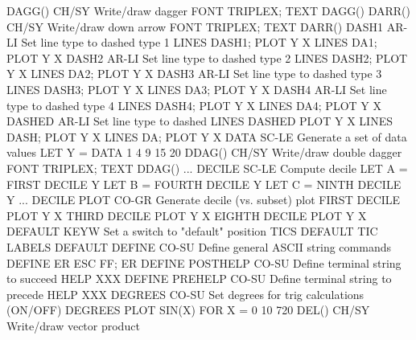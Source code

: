 DAGG()                      CH/SY Write/draw dagger
                                  FONT TRIPLEX; TEXT DAGG()
DARR()                      CH/SY Write/draw down arrow
                                  FONT TRIPLEX; TEXT DARR()
DASH1                       AR-LI Set line type to dashed type 1
                                  LINES DASH1; PLOT Y X
                                  LINES DA1; PLOT Y X
DASH2                       AR-LI Set line type to dashed type 2
                                  LINES DASH2; PLOT Y X
                                  LINES DA2; PLOT Y X
DASH3                       AR-LI Set line type to dashed type 3
                                  LINES DASH3; PLOT Y X
                                  LINES DA3; PLOT Y X
DASH4                       AR-LI Set line type to dashed type 4
                                  LINES DASH4; PLOT Y X
                                  LINES DA4; PLOT Y X
DASHED                      AR-LI Set line type to dashed
                                  LINES DASHED PLOT Y X
                                  LINES DASH; PLOT Y X
                                  LINES DA; PLOT Y X
DATA                        SC-LE Generate a set of data values
                                  LET Y = DATA 1 4 9 15 20
DDAG()                      CH/SY Write/draw double dagger
                                  FONT TRIPLEX; TEXT DDAG()
... DECILE                  SC-LE Compute decile
                                  LET A = FIRST DECILE Y
                                  LET B = FOURTH DECILE Y
                                  LET C = NINTH DECILE Y
... DECILE PLOT             CO-GR Generate decile (vs. subset) plot
                                  FIRST DECILE PLOT Y X
                                  THIRD DECILE PLOT Y X
                                  EIGHTH DECILE PLOT Y X
DEFAULT                     KEYW  Set a switch to "default" position
                                  TICS DEFAULT
                                  TIC LABELS DEFAULT
DEFINE                      CO-SU Define general ASCII string commands
                                  DEFINE ER ESC FF; ER
DEFINE POSTHELP             CO-SU Define terminal string to succeed HELP
                                  XXX
DEFINE PREHELP              CO-SU Define terminal string to precede HELP
                                  XXX
DEGREES                     CO-SU Set degrees for trig calculations (ON/OFF)
                                  DEGREES
                                  PLOT SIN(X) FOR X = 0 10 720
DEL()                       CH/SY Write/draw vector product
